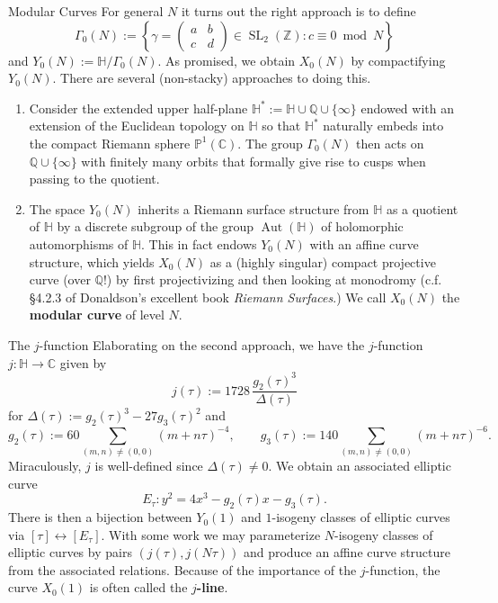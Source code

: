 \documentclass[aspectratio=1610]{beamer}
\renewcommand{\P}{\mathbb{P}}
\newcommand{\C}{\mathbb{C}}
\newcommand{\HH}{\mathbb{H}}
\newcommand{\Q}{\mathbb{Q}}
\newcommand{\Z}{\mathbb{Z}}
\newcommand{\df}{\dfrac}
\DeclareMathOperator{\Aut}{Aut}
\DeclareMathOperator{\SL}{SL}
\begin{document}
\begin{frame}{Modular Curves}
For general $N$ it turns out the right approach is to define
$$\Gamma_0(N):=\left\{\gamma=\begin{pmatrix}a & b\\c & d\end{pmatrix}\in\SL_2(\Z) : c\equiv0\bmod{N}\right\}$$
and $Y_0(N):=\HH/\Gamma_0(N)$. As promised, we obtain $X_0(N)$ by compactifying $Y_0(N)$. There are several (non-stacky) approaches to doing this.
\begin{enumerate}
\item Consider the extended upper half-plane $\HH^*:=\HH\cup\Q\cup\{\infty\}$ endowed with an extension of the Euclidean topology on $\HH$ so that $\HH^*$ naturally embeds into the compact Riemann sphere $\P^1(\C)$. The group $\Gamma_0(N)$ then acts on $\Q\cup\{\infty\}$ with finitely many orbits that formally give rise to cusps when passing to the quotient.

\item The space $Y_0(N)$ inherits a Riemann surface structure from $\HH$ as a quotient of $\HH$ by a discrete subgroup of the group $\Aut(\HH)$ of holomorphic automorphisms of $\HH$. This in fact endows $Y_0(N)$ with an affine curve structure, which yields $X_0(N)$ as a (highly singular) compact projective curve (over $\Q$!) by first projectivizing and then looking at monodromy (c.f. \S4.2.3 of Donaldson's excellent book \textit{Riemann Surfaces}.) We call $X_0(N)$ the \textbf{modular curve} of level $N$.
\end{enumerate}
\end{frame}

\begin{frame}{The $j$-function}
Elaborating on the second approach, we have the $j$-function $j: \HH\to\C$ given by 
$$j(\tau):=1728\,\df{g_2(\tau)^3}{\Delta(\tau)}$$
for $\Delta(\tau):=g_2(\tau)^3-27g_3(\tau)^2$ and
$$g_2(\tau):=60\sum_{(m,n)\neq(0,0)}(m+n\tau)^{-4},\qquad g_3(\tau):=140\sum_{(m,n)\neq(0,0)}(m+n\tau)^{-6}.$$
Miraculously, $j$ is well-defined since $\Delta(\tau)\neq0$. We obtain an associated elliptic curve 
$$E_{\tau}: y^2=4x^3-g_2(\tau)x-g_3(\tau).$$
There is then a bijection between $Y_0(1)$ and $1$-isogeny classes of elliptic curves via $[\tau]\longleftrightarrow[E_{\tau}]$. With some work we may parameterize $N$-isogeny classes of elliptic curves by pairs $(j(\tau),j(N\tau))$ and produce an affine curve structure from the associated relations. Because of the importance of the $j$-function, the curve $X_0(1)$ is often called the \textbf{$j$-line}.
\end{frame}
\end{document}
